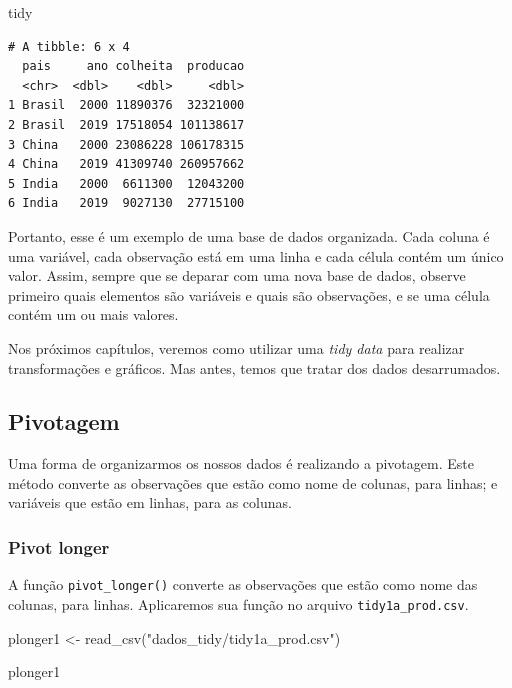 \documentclass[
  brazilian,
]{book}
\newenvironment{Shaded}{\begin{snugshade}}{\end{snugshade}}
\newcommand{\FunctionTok}[1]{\textcolor[rgb]{0.00,0.00,0.00}{#1}}
\newcommand{\NormalTok}[1]{#1}
\newcommand{\OtherTok}[1]{\textcolor[rgb]{0.56,0.35,0.01}{#1}}
\newcommand{\StringTok}[1]{\textcolor[rgb]{0.31,0.60,0.02}{#1}}
\begin{document}
\begin{Shaded}
\begin{Highlighting}[]
\NormalTok{tidy}
\end{Highlighting}
\end{Shaded}

\begin{verbatim}
# A tibble: 6 x 4
  pais     ano colheita  producao
  <chr>  <dbl>    <dbl>     <dbl>
1 Brasil  2000 11890376  32321000
2 Brasil  2019 17518054 101138617
3 China   2000 23086228 106178315
4 China   2019 41309740 260957662
5 India   2000  6611300  12043200
6 India   2019  9027130  27715100
\end{verbatim}

Portanto, esse é um exemplo de uma base de dados organizada. Cada coluna é uma variável, cada observação está em uma linha e cada célula contém um único valor. Assim, sempre que se deparar com uma nova base de dados, observe primeiro quais elementos são variáveis e quais são observações, e se uma célula contém um ou mais valores.

Nos próximos capítulos, veremos como utilizar uma \emph{tidy data} para realizar transformações e gráficos. Mas antes, temos que tratar dos dados desarrumados.

\hypertarget{pivotagem}{%
\subsection{Pivotagem}\label{pivotagem}}

Uma forma de organizarmos os nossos dados é realizando a pivotagem. Este método converte as observações que estão como nome de colunas, para linhas; e variáveis que estão em linhas, para as colunas.

\hypertarget{pivot-longer}{%
\subsubsection*{Pivot longer}\label{pivot-longer}}

A função \texttt{pivot\_longer()} converte as observações que estão como nome das colunas, para linhas. Aplicaremos sua função no arquivo \texttt{tidy1a\_prod.csv}.

\begin{Shaded}
\begin{Highlighting}[]
\NormalTok{plonger1 }\OtherTok{\textless{}{-}} \FunctionTok{read\_csv}\NormalTok{(}\StringTok{"dados\_tidy/tidy1a\_prod.csv"}\NormalTok{)}

\NormalTok{plonger1}
\end{Highlighting}
\end{Shaded}
\end{document}
